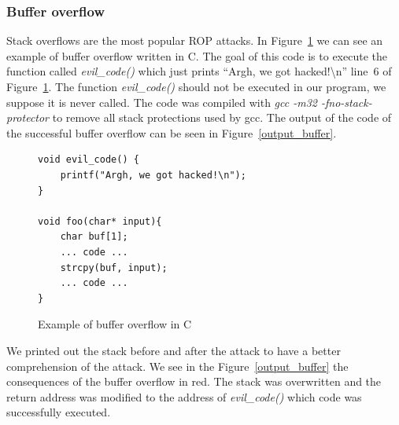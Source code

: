 \documentclass[11pt]{sdm}
\begin{document}
\subsubsection{Buffer overflow}
\label{ssub:Buffer overflow}

Stack overflows are the most popular ROP attacks. In Figure~\ref{buffer_overflow_code} we can see an example of buffer overflow written in C.
The goal of this code is to execute the function called \textit{evil\_code()} which just prints ``Argh, we got hacked!\textbackslash{n}'' line~6 of Figure~\ref{buffer_overflow_code}. The function \textit{evil\_code()} should not be executed in our program, we suppose it is never called.
The code was compiled with \textit{gcc -m32 -fno-stack-protector} to remove all stack protections used by gcc. The output of the code of the successful buffer overflow can be seen in Figure~\ref{output_buffer}.
\begin{figure}[!ht]
\begin{lstlisting}
void evil_code() {
	printf("Argh, we got hacked!\n");
}

void foo(char* input){
	char buf[1];
	... code ...
	strcpy(buf, input);
	... code ...
}
\end{lstlisting}
\centering
\caption{Example of buffer overflow in C}
\label{buffer_overflow_code}
\end{figure}

We printed out the stack before and after the attack to have a better comprehension of the attack.
We see in the Figure~\ref{output_buffer} the consequences of the buffer overflow in red. The stack was overwritten and the return address was modified to the address of \textit{evil\_code()} which code was successfully executed.
\end{document}
